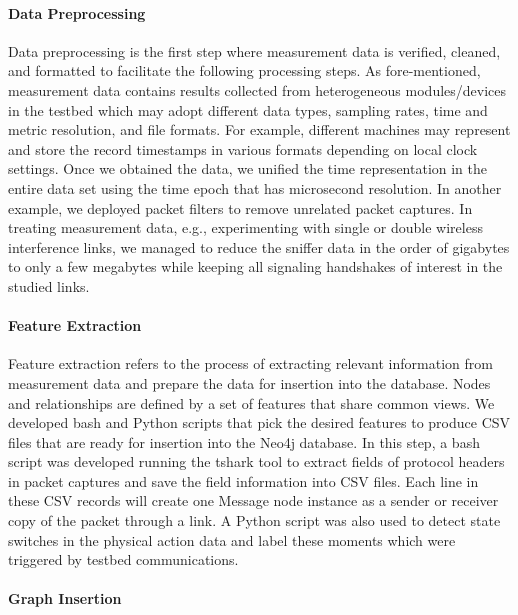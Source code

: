 \paragraph{Data Preprocessing}

Data preprocessing is the first step where measurement data is verified, cleaned, and formatted to facilitate the following processing steps. As fore-mentioned, measurement data contains results collected from heterogeneous modules/devices in the testbed which may adopt different data types, sampling rates, time and metric resolution, and file formats. For example, different machines may represent and store the record timestamps in various formats depending on local clock settings. Once we obtained the data, we unified the time representation in the entire data set using the time epoch that has microsecond resolution. In another example, we deployed packet filters to remove unrelated packet captures. In treating measurement data, e.g., experimenting with single or double wireless interference links, we managed to reduce the sniffer data in the order of gigabytes to only a few megabytes while keeping all signaling handshakes of interest in the studied links. 

\paragraph{Feature Extraction}

Feature extraction refers to the process of extracting relevant information from measurement data and prepare the data for insertion into the database. Nodes and relationships are defined by a set of features that share common views. We developed bash and Python scripts that pick the desired features to produce CSV files that are ready for insertion into the Neo4j database. In this step, a bash script was developed running the tshark tool to extract fields of protocol headers in packet captures and save the field information into CSV files. Each line in these CSV records will create one Message node instance as a sender or receiver copy of the packet through a link. A Python script was also used to detect state switches in the physical action data and label these moments which were triggered by testbed communications.


\paragraph{Graph Insertion}

